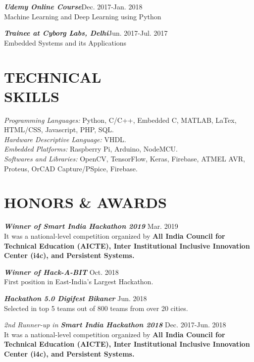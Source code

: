 \documentclass[margin, 10pt]{res} %
\begin{document}
\begin{resume}
{\sl \bf{Udemy Online Course}}\hfill Dec. 2017-Jan. 2018\\
Machine Learning and Deep Learning using Python


{\sl \bf{Trainee at Cyborg Labs, Delhi}}\hfill Jun. 2017-Jul. 2017\\
Embedded Systems and its Applications

\section{TECHNICAL \\ SKILLS} 

{\sl Programming Languages:} Python, C/C++, Embedded C, MATLAB, LaTex, HTML/CSS, Javascript, PHP, SQL.  \\
{\sl Hardware Descriptive Language:} VHDL. \\
{\sl Embedded Platforms:} Raspberry Pi, Arduino, NodeMCU. \\
{\sl Softwares and Libraries:} OpenCV, TensorFlow, Keras, Firebase, ATMEL AVR, Proteus, OrCAD Capture/PSpice, Firebase. 



\section{HONORS \& AWARDS}

{\sl \bf{Winner of Smart India Hackathon 2019} } \hfill Mar. 2019\\It was a national-level competition organized by \bf{All India Council for Technical Education (AICTE), Inter Institutional Inclusive Innovation Center (i4c),} and \bf{Persistent Systems}.

{\sl \bf{Winner of Hack-A-BIT} } \hfill Oct. 2018\\ First position in East-India's Largest Hackathon.

{\sl \bf{Hackathon 5.0 Digifest Bikaner} } \hfill Jun. 2018 \\ Selected in top 5 teams out of 800 teams from over 20 cities.

{\sl 2nd Runner-up in \bf{Smart India Hackathon 2018} } \hfill Dec. 2017-Jun. 2018 \\ It was a national-level competition organized by \bf{All India Council for Technical Education (AICTE), Inter Institutional Inclusive Innovation Center (i4c),} and \bf{Persistent Systems}.


\end{resume}
\end{document}
